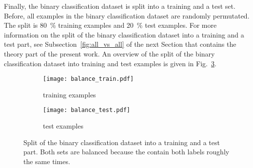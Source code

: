 Finally, the binary classification dataset is split into a training and a test set. Before, all examples in the binary classification dataset are randomly permutated. The split is \SI{80}{\percent} training examples and \SI{20}{\percent} test examples. For more information on the split of the binary classification dataset into a training and a test part, see Subsection~\ref{fig:all_vs_all} of the next Section that contains the theory part of the present work. An overview of the split of the binary classification dataset into training and test examples is given in Fig.~\ref{fig:test}.

\begin{figure}
\centering
\begin{subfigure}{.5\textwidth}
  \centering
  \texttt{[image: balance\_train.pdf]}
  \caption{training examples}
  \label{fig:sub1}
\end{subfigure}%
\begin{subfigure}{.5\textwidth}
  \centering
  \texttt{[image: balance\_test.pdf]}
  \caption{test examples}
  \label{fig:sub2}
\end{subfigure}
\caption{Split of the binary classification dataset into a training and a test part. Both sets are balanced because the contain both labels roughly the same times.}
\label{fig:test}
\end{figure}

\clearpage